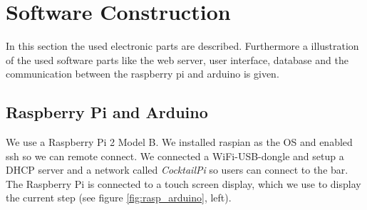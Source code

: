 \documentclass{acm_proc_article-sp}
\begin{document}
\begin{minipage}{\linewidth}%
\label{fig:soldering}%
\end{minipage}



\section{Software Construction}
In this section the used electronic parts are described. Furthermore a illustration of the used software parts like the web server, user interface, database and the communication between the raspberry pi and arduino is given.

\subsection{Raspberry Pi and Arduino}
We use a Raspberry Pi 2 Model B. We installed raspian as the OS and enabled ssh so we can remote connect. We connected a WiFi-USB-dongle and setup a DHCP server and a network called \textit{CocktailPi} so users can connect to the bar. The Raspberry Pi is connected to a touch screen display, which we use to display the current step (see figure \ref{fig:rasp_arduino}, left).
\end{document}
